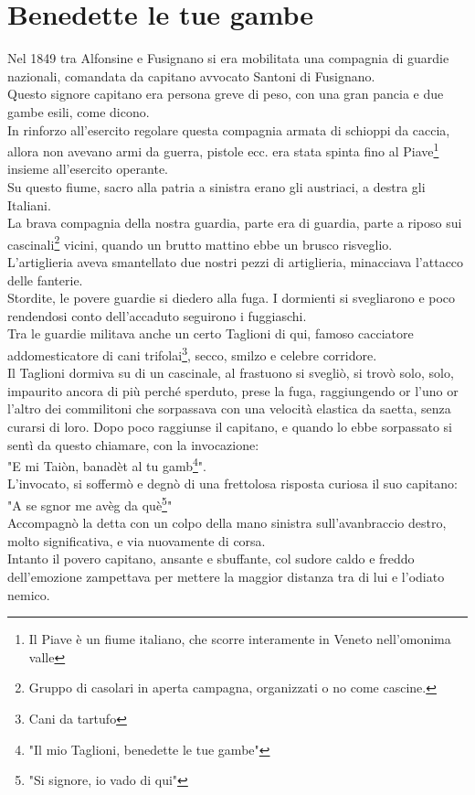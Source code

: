 \documentclass[10pt]{memoir} %
\begin{document}

\chapter{Benedette le tue gambe}
Nel 1849 tra Alfonsine e Fusignano si era mobilitata una compagnia di guardie nazionali, comandata da capitano avvocato  Santoni di Fusignano.\\
Questo signore capitano era persona greve di peso, con una gran pancia e due gambe esili, come dicono.\\
In rinforzo all'esercito regolare questa compagnia armata di schioppi da caccia, allora non avevano armi da guerra, pistole ecc. era stata spinta fino al Piave\footnote{Il Piave è un fiume italiano, che scorre interamente in Veneto nell'omonima valle} insieme all'esercito operante.\\
Su questo fiume, sacro alla patria a sinistra erano gli austriaci, a destra gli Italiani.\\
La brava compagnia della nostra guardia, parte era di guardia, parte a riposo sui cascinali\footnote{Gruppo di casolari in aperta campagna, organizzati o no come cascine.} vicini, quando un brutto mattino ebbe un brusco risveglio.\\
L'artiglieria aveva smantellato due nostri pezzi di artiglieria, minacciava l'attacco delle fanterie. \\
Stordite, le povere guardie si diedero alla fuga. I dormienti si svegliarono e poco rendendosi conto dell'accaduto seguirono i fuggiaschi.\\
Tra le guardie militava anche un certo Taglioni di qui, famoso cacciatore addomesticatore di cani trifolai\footnote{Cani da tartufo}, secco, smilzo e celebre corridore. \\
Il Taglioni dormiva su di un cascinale, al frastuono si svegliò, si trovò solo, solo, impaurito ancora di più perché sperduto, prese la fuga, raggiungendo or l'uno or l'altro dei commilitoni che sorpassava con una velocità elastica da saetta, senza curarsi di loro. 
Dopo poco raggiunse il capitano, e quando lo ebbe sorpassato si sentì da questo chiamare, con la invocazione:\\
"E mi Taiòn, banadèt al tu gamb\footnote{"Il mio Taglioni, benedette le tue gambe"}".\\
L'invocato, si soffermò e degnò di una frettolosa risposta curiosa il suo capitano:\\
"A se sgnor me avèg da què\footnote{"Si signore, io vado di qui"}"\\
Accompagnò la detta con un colpo della mano sinistra sull'avanbraccio destro, molto significativa, e via nuovamente di corsa.\\
Intanto il povero capitano, ansante e sbuffante, col sudore caldo e freddo dell'emozione zampettava per mettere la maggior distanza tra di lui e l'odiato nemico.\\
\end{document}
